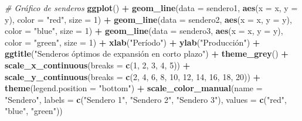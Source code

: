 \documentclass[
  spanish,
  12pt,
]{book}
\newenvironment{Shaded}{\begin{snugshade}}{\end{snugshade}}
\newcommand{\AttributeTok}[1]{\textcolor[rgb]{0.13,0.29,0.53}{#1}}
\newcommand{\CommentTok}[1]{\textcolor[rgb]{0.56,0.35,0.01}{\textit{#1}}}
\newcommand{\DecValTok}[1]{\textcolor[rgb]{0.00,0.00,0.81}{#1}}
\newcommand{\FunctionTok}[1]{\textcolor[rgb]{0.13,0.29,0.53}{\textbf{#1}}}
\newcommand{\NormalTok}[1]{#1}
\newcommand{\SpecialCharTok}[1]{\textcolor[rgb]{0.81,0.36,0.00}{\textbf{#1}}}
\newcommand{\StringTok}[1]{\textcolor[rgb]{0.31,0.60,0.02}{#1}}
\begin{document}
\begin{Shaded}
\begin{Highlighting}[]
\CommentTok{\# Gráfico de senderos}
\FunctionTok{ggplot}\NormalTok{() }\SpecialCharTok{+}
  \FunctionTok{geom\_line}\NormalTok{(}\AttributeTok{data =}\NormalTok{ sendero1, }\FunctionTok{aes}\NormalTok{(}\AttributeTok{x =}\NormalTok{ x, }\AttributeTok{y =}\NormalTok{ y), }
            \AttributeTok{color =} \StringTok{"red"}\NormalTok{, }\AttributeTok{size =} \DecValTok{1}\NormalTok{) }\SpecialCharTok{+}
  \FunctionTok{geom\_line}\NormalTok{(}\AttributeTok{data =}\NormalTok{ sendero2, }\FunctionTok{aes}\NormalTok{(}\AttributeTok{x =}\NormalTok{ x, }\AttributeTok{y =}\NormalTok{ y), }
            \AttributeTok{color =} \StringTok{"blue"}\NormalTok{, }\AttributeTok{size =} \DecValTok{1}\NormalTok{) }\SpecialCharTok{+}
  \FunctionTok{geom\_line}\NormalTok{(}\AttributeTok{data =}\NormalTok{ sendero3, }\FunctionTok{aes}\NormalTok{(}\AttributeTok{x =}\NormalTok{ x, }\AttributeTok{y =}\NormalTok{ y), }
            \AttributeTok{color =} \StringTok{"green"}\NormalTok{, }\AttributeTok{size =} \DecValTok{1}\NormalTok{) }\SpecialCharTok{+}
  \FunctionTok{xlab}\NormalTok{(}\StringTok{"Período"}\NormalTok{) }\SpecialCharTok{+}
  \FunctionTok{ylab}\NormalTok{(}\StringTok{"Producción"}\NormalTok{) }\SpecialCharTok{+}
  \FunctionTok{ggtitle}\NormalTok{(}\StringTok{"Senderos óptimos de expansión en corto plazo"}\NormalTok{) }\SpecialCharTok{+}
  \FunctionTok{theme\_grey}\NormalTok{() }\SpecialCharTok{+}
  \FunctionTok{scale\_x\_continuous}\NormalTok{(}\AttributeTok{breaks =} \FunctionTok{c}\NormalTok{(}\DecValTok{1}\NormalTok{, }\DecValTok{2}\NormalTok{, }\DecValTok{3}\NormalTok{, }\DecValTok{4}\NormalTok{, }\DecValTok{5}\NormalTok{)) }\SpecialCharTok{+}
  \FunctionTok{scale\_y\_continuous}\NormalTok{(}\AttributeTok{breaks =} \FunctionTok{c}\NormalTok{(}\DecValTok{2}\NormalTok{, }\DecValTok{4}\NormalTok{, }\DecValTok{6}\NormalTok{, }\DecValTok{8}\NormalTok{, }\DecValTok{10}\NormalTok{, }\DecValTok{12}\NormalTok{, }\DecValTok{14}\NormalTok{, }\DecValTok{16}\NormalTok{, }\DecValTok{18}\NormalTok{, }\DecValTok{20}\NormalTok{)) }\SpecialCharTok{+}
  \FunctionTok{theme}\NormalTok{(}\AttributeTok{legend.position =} \StringTok{"bottom"}\NormalTok{) }\SpecialCharTok{+}
  \FunctionTok{scale\_color\_manual}\NormalTok{(}\AttributeTok{name =} \StringTok{"Sendero"}\NormalTok{,}
                     \AttributeTok{labels =} \FunctionTok{c}\NormalTok{(}\StringTok{"Sendero 1"}\NormalTok{, }\StringTok{"Sendero 2"}\NormalTok{, }\StringTok{"Sendero 3"}\NormalTok{),}
                     \AttributeTok{values =} \FunctionTok{c}\NormalTok{(}\StringTok{"red"}\NormalTok{, }\StringTok{"blue"}\NormalTok{, }\StringTok{"green"}\NormalTok{))}
\end{Highlighting}
\end{Shaded}
\end{document}
